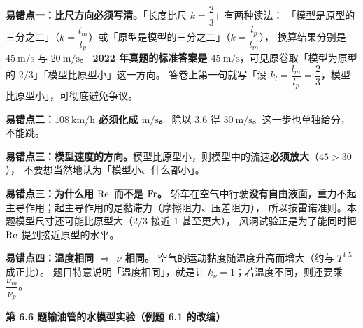 \begin{yicuo}
\textbf{易错点一：比尺方向必须写清。}「长度比尺 $k=\dfrac{2}{3}$」有两种读法：
「模型是原型的三分之二」（$k=\dfrac{l_m}{l_p}$）或「原型是模型的三分之二」（$k=\dfrac{l_p}{l_m}$），
换算结果分别是 $45\ \mathrm{m/s}$ 与 $20\ \mathrm{m/s}$。
\textbf{2022 年真题的标准答案是 $45\ \mathrm{m/s}$}，可见原卷取「模型为原型的 $2/3$」「模型比原型小」这一方向。
答卷上第一句就写「设 $k_l=\dfrac{l_m}{l_p}=\dfrac{2}{3}$，模型比原型小」，可彻底避免争议。

\textbf{易错点二：$108\ \mathrm{km/h}$ 必须化成 $\mathrm{m/s}$。}
除以 $3.6$ 得 $30\ \mathrm{m/s}$。这一步也单独给分，不能跳。

\textbf{易错点三：模型速度的方向。}模型比原型小，则模型中的流速\textbf{必须放大}（$45>30$），
不要想当然地认为「模型小、什么都小」。

\textbf{易错点三：为什么用 $\mathrm{Re}$ 而不是 $\mathrm{Fr}$。}
轿车在空气中行驶\textbf{没有自由液面}，重力不起主导作用；起主导作用的是黏滞力（摩擦阻力、压差阻力），
所以按雷诺准则。本题模型尺寸还可能比原型大（$2/3$ 接近 1 甚至更大），
风洞试验正是为了能同时把 $\mathrm{Re}$ 提到接近原型的水平。

\textbf{易错点四：温度相同 $\Rightarrow$ $\nu$ 相同。}
空气的运动黏度随温度升高而增大（约与 $T^{1.5}$ 成正比）。
题目特意说明「温度相同」，就是让 $k_\nu=1$；若温度不同，则还要乘 $\dfrac{\nu_m}{\nu_p}$。
\end{yicuo}

\noindent\textbf{第 6.6 题\quad 输油管的水模型实验（例题 6.1 的改编）}


